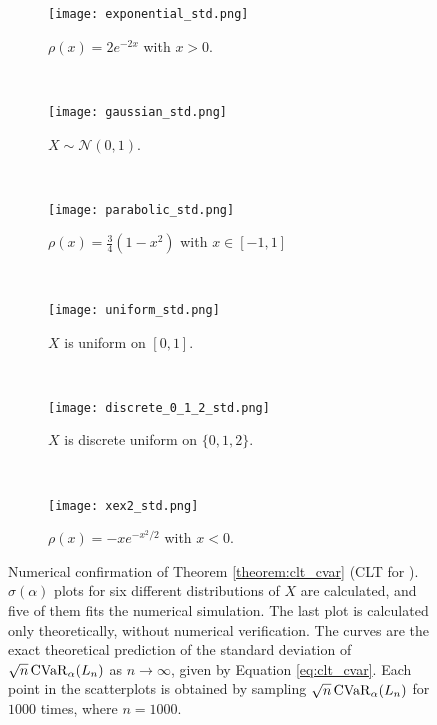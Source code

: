 \begin{figure}
	\centering
	\begin{subfigure}[b]{0.45\textwidth}
		\texttt{[image: exponential\_std.png]}
		\caption{$\rho(x) = 2e^{-2x}$ with $x > 0$.}
		\label{fig:exp_std}
	\end{subfigure}
	~
	\begin{subfigure}[b]{0.45\textwidth}
		\texttt{[image: gaussian\_std.png]}
		\caption{$X\sim \mathcal{N}(0, 1)$.}
		\label{fig:gaussian_std}
	\end{subfigure}
	~
	\begin{subfigure}[b]{0.45\textwidth}
		\texttt{[image: parabolic\_std.png]}
		\caption{$\rho(x) = \frac 34 (1-x^2)$ with $x\in[-1, 1]$}
		\label{fig:parabolic_std}
	\end{subfigure}
	~
	\begin{subfigure}[b]{0.45\textwidth}
		\texttt{[image: uniform\_std.png]}
		\caption{$X$ is uniform on $[0, 1]$.}
		\label{fig:uniform_std}
	\end{subfigure}
	~
	\begin{subfigure}[b]{0.45\textwidth}
		\texttt{[image: discrete\_0\_1\_2\_std.png]}
		\caption{$X$ is discrete uniform on $\{0, 1, 2\}$.}
		\label{fig:discrete_0_1_2_std}
	\end{subfigure}
	~
	\begin{subfigure}[b]{0.47\textwidth}
		\texttt{[image: xex2\_std.png]}
		\caption{$\rho(x) = -xe^{-x^2/2}$ with $x< 0$.}
		\label{fig:xex2_std}
	\end{subfigure}
	\caption{Numerical confirmation of Theorem \ref{theorem:clt_cvar} (CLT for \cvar). $\sigma(\alpha)$ plots for six different distributions of $X$ are calculated, and five of them fits the numerical simulation. The last plot is calculated only theoretically, without numerical verification. The curves are the exact theoretical prediction of the standard deviation of $\sqrt{n}\operatorname{CVaR}_\alpha(L_{n})$ as $n\to \infty$, given by Equation \ref{eq:clt_cvar}. Each point in the scatterplots is obtained by sampling $\sqrt{n}\operatorname{CVaR}_\alpha(L_{n})$ for $1000$ times, where $n = 1000$. }
	\label{fig:cvar_stds}
\end{figure}

